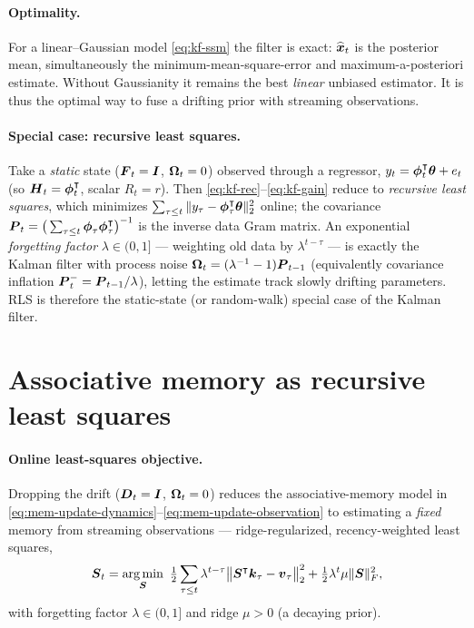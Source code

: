 \documentclass[11pt,letterpaper,logo]{yalearxiv}
\begin{document}
\paragraph{Optimality.}
For a linear--Gaussian model \eqref{eq:kf-ssm} the filter is exact: $\widehat{\boldsymbol{x}}_t$ is the
posterior mean, simultaneously the minimum-mean-square-error and maximum-a-posteriori
estimate. Without Gaussianity it remains the best \emph{linear} unbiased estimator. It
is thus the optimal way to fuse a drifting prior with streaming observations.

\paragraph{Special case: recursive least squares.}
Take a \emph{static} state ($\boldsymbol{F}_t=\boldsymbol{I}$, $\boldsymbol{\Omega}_t=0$) observed through a regressor,
$y_t=\boldsymbol{\phi}_t^{\intercal}\boldsymbol{\theta}+e_t$ (so $\boldsymbol{H}_t=\boldsymbol{\phi}_t^{\intercal}$, scalar $R_t=r$). Then
\eqref{eq:kf-rec}--\eqref{eq:kf-gain} reduce to \emph{recursive least squares}, which
minimizes $\sum_{\tau\le t}\|y_\tau-\boldsymbol{\phi}_\tau^{\intercal}\boldsymbol{\theta}\|_2^2$ online; the covariance
$\boldsymbol{P}_t=\big(\sum_{\tau\le t}\boldsymbol{\phi}_\tau\boldsymbol{\phi}_\tau^{\intercal}\big)^{-1}$ is the inverse data Gram
matrix. An exponential \emph{forgetting factor} $\lambda\in(0,1]$ --- weighting old
data by $\lambda^{t-\tau}$ --- is exactly the Kalman filter with process noise
$\boldsymbol{\Omega}_t=(\lambda^{-1}-1)\boldsymbol{P}_{t-1}$ (equivalently covariance inflation $\boldsymbol{P}_t^-=\boldsymbol{P}_{t-1}/\lambda$),
letting the estimate track slowly drifting parameters. RLS is therefore the
static-state (or random-walk) special case of the Kalman filter.

\section{Associative memory as recursive least squares}
\label{app:mem-rls}

\paragraph{Online least-squares objective.}
Dropping the drift ($\boldsymbol{D}_t=\boldsymbol{I}$, $\boldsymbol{\Omega}_t=0$) reduces the associative-memory model
in \eqref{eq:mem-update-dynamics}--\eqref{eq:mem-update-observation} to estimating
a \emph{fixed} memory from streaming observations --- ridge-regularized, recency-weighted
least squares,
\begin{equation}
  \ve{S}_t = \argmin_{\ve{S}}\ \tfrac12\sum_{\tau\le t}\lambda^{t-\tau}
  \big\|\ve{S}^{\tr}\ve{k}_\tau-\ve{v}_\tau\big\|_2^2
        + \tfrac12\lambda^{t}\mu\|\ve{S}\|_F^2 ,
  \label{eq:rls-obj}
\end{equation}
with forgetting factor $\lambda\in(0,1]$ and ridge $\mu>0$ (a decaying prior).
\end{document}
